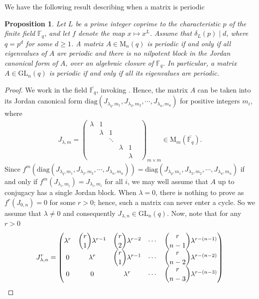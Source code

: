 \documentclass[11pt,twoside]{amsart}
\newcommand{\GL}{\mathrm{GL}}
\newcommand{\M}{\mathrm{M}}
\newcommand{\F}{\mathbb{F}}
\newcommand{\diag}{\mathrm{diag}}
\newtheorem{proposition}[lemma]{Proposition}
\theoremstyle{definition} %
\begin{document}
We have the following result describing when a matrix is periodic
\begin{proposition}\label{prop:candidacy}
Let $L$ be a prime integer coprime to the characteristic $p$ of the finite field $\F_q$, and let $f$ denote the map $x\mapsto x^L$. Assume that $\delta_L(p)\mid d$, where $q=p^d$ for some $d\ge 1$.
A matrix $A \in \M_n(q)$ is periodic if and only if all eigenvalues of $A$ are periodic and there is no nilpotent block in the Jordan canonical form of $A$, over an algebraic closure of $\F_q$.
In particular, a matrix $A\in \GL_n(q)$ is periodic if and only if all its eigenvalues are periodic.
\end{proposition}
\begin{proof}
    We work in the field $\overline{\F_q}$, invoking . 
    Hence, the matrix $A$ can be taken into its Jordan canonical form $\diag(J_{\lambda_q,m_1},J_{\lambda_2,m_2},\cdots, J_{\lambda_u,m_u})$ for positive integers $m_i$, where
    \begin{align*}
        J_{\lambda,m}=\begin{pmatrix}
            \lambda & 1 &&&&\\
            &\lambda&1&&&\\
            &&\ddots&&&\\
            &&&\lambda&1\\
            &&&&\lambda
        \end{pmatrix}_{m\times m}\in\M_m(\overline{\F_q}).
    \end{align*}
    Since $f^m(\diag(J_{\lambda_q,m_1},J_{\lambda_2,m_2},\cdots, J_{\lambda_u,m_u}))=\diag(J_{\lambda_q,m_1},J_{\lambda_2,m_2},\cdots, J_{\lambda_u,m_u})$ if and only if $f^m(J_{\lambda_i,m_i})=J_{\lambda_i,m_i}$ for all $i$, we may well assume that $A$ up to conjugacy has a single Jordan block.
    When $\lambda=0$, there is nothing to prove as $f^r(J_{0,n})=0$ for some $r>0$; hence, such a matrix can never enter a cycle. 
    So we assume that $\lambda\neq0$ and consequently $J_{\lambda,n}\in\GL_n(q)$.
    Now, note that for any $r>0$
    \begin{align*}
        J_{\lambda,n}^r=
\begin{pmatrix}
\lambda^r & \dbinom{r}{1}\lambda^{r-1} & \dbinom{r}{2}\lambda^{r-2} & \cdots & \dbinom{r}{n-1}\lambda^{r-(n-1)} \\
0 & \lambda^r & \dbinom{r}{1}\lambda^{r-1} & \cdots & \dbinom{r}{n-2}\lambda^{r-(n-2)} \\
0 & 0 & \lambda^r & \cdots & \dbinom{r}{n-3}\lambda^{r-(n-3)} \\

\end{pmatrix}
\end{align*}
\end{proof}
\end{document}
